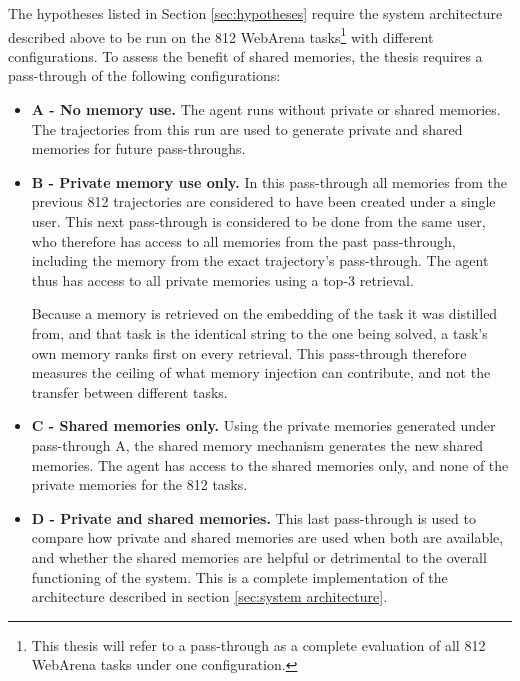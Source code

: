 The hypotheses listed in Section \ref{sec:hypotheses} require the system architecture described above to be run on the 812 WebArena tasks\footnote{This thesis will refer to a pass-through as a complete evaluation of all 812 WebArena tasks under one configuration.} with different configurations. To assess the benefit of shared memories, the thesis requires a pass-through of the following configurations:
\begin{itemize}
    \item \textbf{A - No memory use.} The agent runs without private or shared memories. The trajectories from this run are used to generate private and shared memories for future pass-throughs.

    \item \textbf{B - Private memory use only.} In this pass-through all memories from the previous 812 trajectories are considered to have been created under a single user. This next pass-through is considered to be done from the same user, who therefore has access to all memories from the past pass-through, including the memory from the exact trajectory's pass-through. The agent thus has access to all private memories using a top-3 retrieval.

    Because a memory is retrieved on the embedding of the task it was distilled from, and that task is the identical string to the one being solved, a task's own memory ranks first on every retrieval. This pass-through therefore measures the ceiling of what memory injection can contribute, and not the transfer between different tasks.

    \item \textbf{C - Shared memories only.} Using the private memories generated under pass-through A, the shared memory mechanism generates the new shared memories. The agent has access to the shared memories only, and none of the private memories for the 812 tasks.

    \item \textbf{D - Private and shared memories.} This last pass-through is used to compare how private and shared memories are used when both are available, and whether the shared memories are helpful or detrimental to the overall functioning of the system. This is a complete implementation of the architecture described in section \ref{sec:system architecture}.
\end{itemize}

